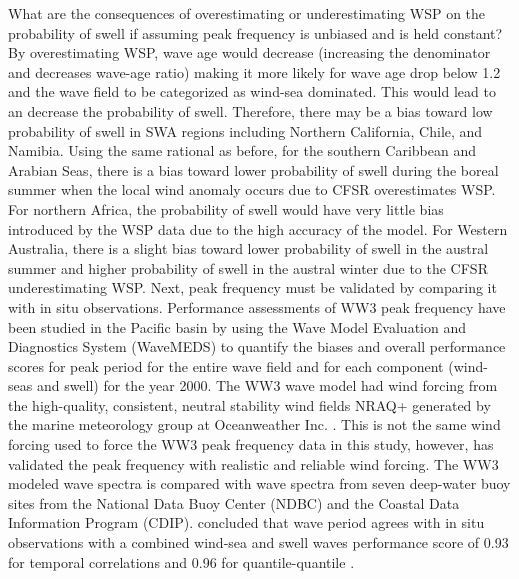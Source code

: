 \documentclass[draft,linenumbers]{agujournal2018}
\begin{document}
What are the consequences of overestimating or underestimating WSP on the probability of swell if assuming peak frequency is unbiased and is held constant? By overestimating WSP, wave age would decrease (increasing the denominator and decreases wave-age ratio) making it more likely for wave age drop below 1.2 and the wave field to be categorized as wind-sea dominated. This would lead to an decrease the probability of swell. Therefore, there may be a bias toward low probability of swell in SWA regions including Northern California, Chile, and Namibia. Using the same rational as before, for the southern Caribbean and Arabian Seas, there is a bias toward lower probability of swell during the boreal summer when the local wind anomaly occurs due to CFSR overestimates WSP. For northern Africa, the probability of swell would have very little bias introduced by the WSP data due to the high accuracy of the model. For Western Australia, there is a slight bias toward lower probability of swell in the austral summer and higher probability of swell in the austral winter due to the CFSR underestimating WSP. Next, peak frequency must be validated by comparing it with in situ observations. Performance assessments of WW3 peak frequency have been studied in the Pacific basin by \citet{hanson2009pacific} using the Wave Model Evaluation and Diagnostics System (WaveMEDS) to quantify the biases and overall performance scores for peak period for the entire wave field and for each component (wind-seas and swell) for the year 2000. The WW3 wave model had wind forcing from the high-quality, consistent, neutral stability wind fields NRAQ+ generated by the marine meteorology group at Oceanweather Inc. \cite{hanson2009pacific}. This is not the same wind forcing used to force the WW3 peak frequency data in this study, however, \citet{hanson2009pacific} has validated the peak frequency with realistic and reliable wind forcing. The WW3 modeled wave spectra is compared with wave spectra from seven deep-water buoy sites from the National Data Buoy Center (NDBC) and the Coastal Data Information Program (CDIP). \citet{hanson2009pacific} concluded that wave period agrees with in situ observations with a combined wind-sea and swell waves performance score of 0.93 for temporal correlations and 0.96 for quantile-quantile \cite{hanson2009pacific}. 

\end{document}
